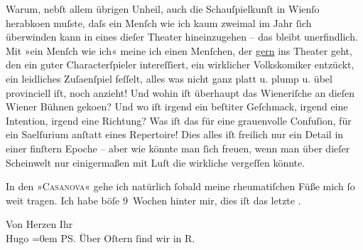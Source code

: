\pstart
           Warum, nebſt allem übrigen Unheil, auch die Schauſpielkunſt in Wienſo herabko{\geminationm}en muſste,
               daſs ein Menſch wie ich kaum zweimal {\pb}im Jahr{ }ſich überwinden kann in
               eines dieſer Theater hineinzugehen – das bleibt unerfindlich. Mit »ein Menſch wie
               ich« meine ich einen Menſchen, der \uline{gern} ins Theater
               geht, den ein guter Characterſpieler intereſſiert, ein wirklicher Volkskomiker
               entzückt, ein leidliches Zuſa{\geminationm}enſpiel feſſelt, alles was
               nicht ganz platt u. plump u. übel provinciell iſt, noch anzieht! Und wohin iſt
               überhaupt das Wieneriſche an dieſen Wiener Bühnen geko{\geminationm}en?
               Und wo iſt irgend ein beſti{\geminationm}ter Geſchmack, {\pb}irgend eine Intention, irgend eine
               Richtung? Was iſt das für eine grauenvolle Confuſion, für ein Sa{\geminationm}elſurium anſtatt eines Repertoire! Dies alles iſt
               freilich nur ein Detail in einer finſtern Epoche – aber wie könnte man{ }ſich freuen,
               wenn man über dieſer Scheinwelt nur einigermaßen mit Luſt die wirkliche vergeſſen
               könnte.\pend
           
\pstart
           In den »\textsc{Casanova}« gehe ich natürlich{ }ſobald meine rheumatiſchen Füße mich{ }ſo weit tragen. Ich
               habe böſe 9 Wochen hinter mir, dies iſt das letzte \label{K_L02339-2v}\label{K_L02339-2}.\pend
           
\pstart
           Von Herzen Ihr{\\[\baselineskip]}\spacefill\mbox{Hugo}\pend
           \leftskip=0em{}
\pstart
           \textsc{PS}. Über Oſtern{ }ſind wir in R.\pend
           \endnumbering{}  \newcommand{\dateiname}{L02339}\newcommand{\titel}{Hugo Hofmannsthal an Arthur Schnitzler, 31. 3. 1920}\newcommand{\editorInnen}{Martin Anton Müller und Gerd-Hermann Susen}
